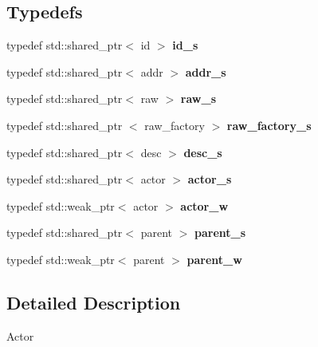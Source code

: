 \subsection*{\-Typedefs}
\begin{DoxyCompactItemize}
\item 
\hypertarget{namespaceglutpp_1_1actor_aa46fc2a6ef847c15d7fae0c2f9a94d1b}{typedef std\-::shared\-\_\-ptr$<$ id $>$ {\bfseries id\-\_\-s}}\label{namespaceglutpp_1_1actor_aa46fc2a6ef847c15d7fae0c2f9a94d1b}

\item 
\hypertarget{namespaceglutpp_1_1actor_a7b9c3a39b23ce1044b5be01bedaf26df}{typedef std\-::shared\-\_\-ptr$<$ addr $>$ {\bfseries addr\-\_\-s}}\label{namespaceglutpp_1_1actor_a7b9c3a39b23ce1044b5be01bedaf26df}

\item 
\hypertarget{namespaceglutpp_1_1actor_aa11f519cc77235fd0ecfcf39022ebcc9}{typedef std\-::shared\-\_\-ptr$<$ raw $>$ {\bfseries raw\-\_\-s}}\label{namespaceglutpp_1_1actor_aa11f519cc77235fd0ecfcf39022ebcc9}

\item 
\hypertarget{namespaceglutpp_1_1actor_af46bb97ed13431575392db64c3aac1dc}{typedef std\-::shared\-\_\-ptr\*
$<$ raw\-\_\-factory $>$ {\bfseries raw\-\_\-factory\-\_\-s}}\label{namespaceglutpp_1_1actor_af46bb97ed13431575392db64c3aac1dc}

\item 
\hypertarget{namespaceglutpp_1_1actor_a47f84b27f53e76a80a72d5c587f8f1f9}{typedef std\-::shared\-\_\-ptr$<$ desc $>$ {\bfseries desc\-\_\-s}}\label{namespaceglutpp_1_1actor_a47f84b27f53e76a80a72d5c587f8f1f9}

\item 
\hypertarget{namespaceglutpp_1_1actor_aad09afbb983342b4e44dc5facbeeeabb}{typedef std\-::shared\-\_\-ptr$<$ actor $>$ {\bfseries actor\-\_\-s}}\label{namespaceglutpp_1_1actor_aad09afbb983342b4e44dc5facbeeeabb}

\item 
\hypertarget{namespaceglutpp_1_1actor_af6ec3ac715b98cfc8d1629d4acbf92ae}{typedef std\-::weak\-\_\-ptr$<$ actor $>$ {\bfseries actor\-\_\-w}}\label{namespaceglutpp_1_1actor_af6ec3ac715b98cfc8d1629d4acbf92ae}

\item 
\hypertarget{namespaceglutpp_1_1actor_a10162031546b1b741f13beb7b1020796}{typedef std\-::shared\-\_\-ptr$<$ parent $>$ {\bfseries parent\-\_\-s}}\label{namespaceglutpp_1_1actor_a10162031546b1b741f13beb7b1020796}

\item 
\hypertarget{namespaceglutpp_1_1actor_a4f223a7a23d399597f65cc34f95845aa}{typedef std\-::weak\-\_\-ptr$<$ parent $>$ {\bfseries parent\-\_\-w}}\label{namespaceglutpp_1_1actor_a4f223a7a23d399597f65cc34f95845aa}

\end{DoxyCompactItemize}


\subsection{\-Detailed \-Description}
\-Actor 